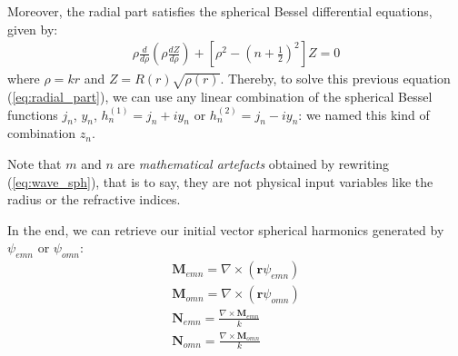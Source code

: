 \documentclass{article}
\numberwithin{equation}{section}
\begin{document}
Moreover, the radial part satisfies the spherical Bessel differential equations, given by:
\begin{align}\label{eq:radial_part}
\rho\frac{d }{d\rho}(\rho\frac{d Z}{d\rho})+[\rho^{2}-(n+\frac{1}{2})^{2}]Z=0
\end{align}
where $\rho=kr$ and $Z=R(r)\sqrt{\rho(r)}$. Thereby, to solve this previous equation (\ref{eq:radial_part}), we can use any linear combination of the spherical Bessel functions $j_{n}$, $y_{n}$, $h^{(1)}_{n}=j_{n}+iy_{n}$ or $h^{(2)}_{n}=j_{n}-iy_{n}$: we named this kind of combination $z_{n}$.

Note that $m$ and $n$ are \textit{mathematical artefacts} obtained by rewriting (\ref{eq:wave_sph}), that is to say, they are not physical input variables like the radius or the refractive indices.

In the end, we can retrieve our initial vector spherical harmonics generated by $\psi_{emn}$ or $\psi_{omn}$:
\begin{align}
\textbf{M}_{emn}=\nabla \times (\textbf{r}\psi_{emn})\\
\textbf{M}_{omn}=\nabla \times (\textbf{r}\psi_{omn})\\
\textbf{N}_{emn}=\frac{\nabla \times \textbf{M}_{emn}}{k}\\
\textbf{N}_{omn}=\frac{\nabla \times \textbf{M}_{omn}}{k}
\end{align}
\end{document}

